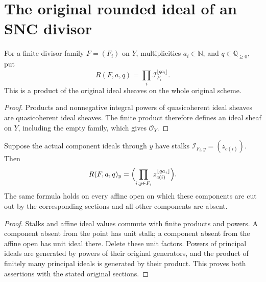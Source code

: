 \section{The original rounded ideal of an SNC divisor}

\begin{definition}
\label{def:rounded-snc-original-product}
\leanok
For a finite divisor family $F=(F_i)$ on $Y$, multiplicities $a_i\in\mathbb N$,
and $q\in\mathbb Q_{\ge0}$, put
\[
 R(F,a,q)=\prod_i\mathcal I_{F_i}^{\lfloor qa_i\rfloor}.
\]
This is a product of the original ideal sheaves on the whole original scheme.
\end{definition}
\begin{proof}
Products and nonnegative integral powers of quasicoherent ideal sheaves are
quasicoherent ideal sheaves. The finite product therefore defines an ideal
sheaf on $Y$, including the empty family, which gives $\mathcal O_Y$.
\end{proof}

\begin{lemma}
\label{lem:rounded-snc-original-stalk}
\leanok
Suppose the actual component ideals through $y$ have stalks
$\mathcal I_{F_i,y}=(z_{c(i)})$. Then
\[
 R(F,a,q)_y=\Bigl(\prod_{i:y\in F_i}z_{c(i)}^{\lfloor qa_i\rfloor}\Bigr).
\]
The same formula holds on every affine open on which these components are
cut out by the corresponding sections and all other components are absent.
\end{lemma}
\begin{proof}
Stalks and affine ideal values commute with finite products and powers.
A component absent from the point has unit stalk; a component absent from
the affine open has unit ideal there. Delete these unit factors. Powers of
principal ideals are generated by powers of their original generators,
and the product of finitely many principal ideals is generated by their
product. This proves both assertions with the stated original sections.
\end{proof}

